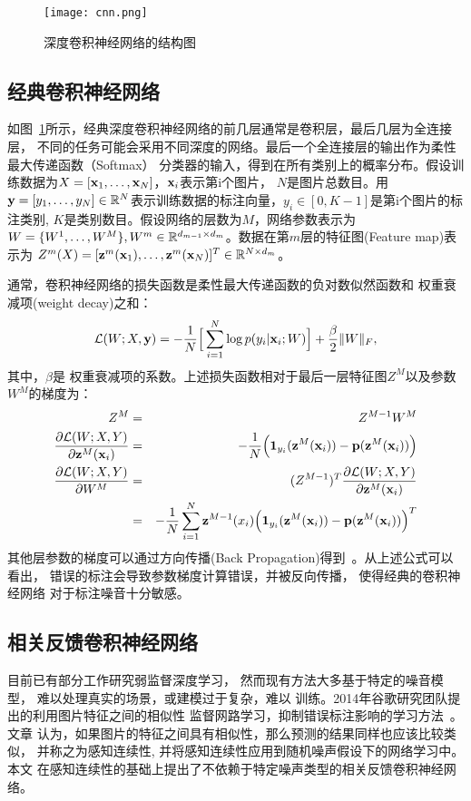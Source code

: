 \begin{figure}[ht]
    \center
    \texttt{[image: cnn.png]}
    \caption{深度卷积神经网络的结构图}
    \label{fig:cnn}
\end{figure}

\subsection{经典卷积神经网络}
如图~\ref{fig:cnn}所示，经典深度卷积神经网络的前几层通常是卷积层，最后几层为全连接层，
不同的任务可能会采用不同深度的网络。最后一个全连接层的输出作为柔性最大传递函数（Softmax）
分类器的输入，得到在所有类别上的概率分布。假设训练数据为$X = [\mathbf{x}_1, \ldots,
\mathbf{x}_N]$，$\mathbf{x}_i$表示第i个图片， $N$是图片总数目。用$\mathbf{y}=[y_1, \ldots, y_N] \in
\mathbb{R}^{N}$表示训练数据的标注向量，$y_i \in [0,K-1]$是第i个图片的标注类别, $K$是类别数目。假设网络的层数为$M$，网络参数表示为
$W = \{W^1, \ldots, W^M\}, W^m \in \mathbb{R}^{d_{m-1}\times d_m}$。数据在第$m$层的特征图(Feature map)表示为
$Z^m(X) = [\mathbf{z}^m(\mathbf{x}_1), \ldots, \mathbf{z}^m(\mathbf{x}_N)]^T \in \mathbb{R}^{N \times d_m}$。

通常，卷积神经网络的损失函数是柔性最大传递函数的负对数似然函数和
权重衰减项(weight decay)之和：
\begin{equation}\label{eqn:cnn-loss}
    \mathcal{L}(W;X,\mathbf{y}) = -\frac{1}{N}\Big[\sum_{i=1}^N {\log p(y_i | \mathbf{x}_i; W)}\Big] + \frac{\beta}{2}\|W\|_F,
\end{equation}
其中，$\beta$是
权重衰减项的系数。上述损失函数相对于最后一层特征图$Z^M$以及参数$W^M$的梯度为：
\begin{eqnarray}
    Z^M &=& Z^{M-1}W^M \\
    \frac{\partial{\mathcal{L}(W;X,Y)}}{\partial{\mathbf{z}^M(\mathbf{x}_i)}} &=&
    -\frac{1}{N} \Big({\mathbf{1}_{y_i}(\mathbf{z}^M(\mathbf{x}_i)) - \mathbf{p}(\mathbf{z}^M(\mathbf{x}_i))}\Big) \\
    \frac{\partial{\mathcal{L}(W;X,Y)}}{\partial{W^M}} &=&
    (Z^{M-1})^T\frac{\partial{\mathcal{L}(W;X,Y)}}{\partial{\mathbf{z}^M(\mathbf{x}_i)}}\\
    &=& -\frac{1}{N}\sum_{i=1}^N {\mathbf{z}^{M-1}(x_i) \Big({\mathbf{1}_{y_i}(\mathbf{z}^M(\mathbf{x}_i))
    - \mathbf{p}(\mathbf{z}^M(\mathbf{x}_i))}\Big)^T}
\end{eqnarray}
其他层参数的梯度可以通过方向传播(Back
Propagation)得到~\cite{lecun1998gradient}。从上述公式可以看出，
错误的标注会导致参数梯度计算错误，并被反向传播， 使得经典的卷积神经网络
对于标注噪音十分敏感。

\subsection{相关反馈卷积神经网络}
目前已有部分工作研究弱监督深度学习， 然而现有方法大多基于特定的噪音模型，
难以处理真实的场景，或建模过于复杂，难以
训练。2014年谷歌研究团队提出的利用图片特征之间的相似性
监督网路学习，抑制错误标注影响的学习方法~\cite{reed2014training}。文章
认为，如果图片的特征之间具有相似性，那么预测的结果同样也应该比较类似，
并称之为感知连续性, 并将感知连续性应用到随机噪声假设下的网络学习中。本文
在感知连续性的基础上提出了不依赖于特定噪声类型的相关反馈卷积神经网络。

